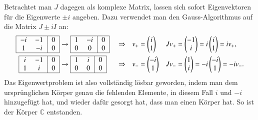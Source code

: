 Betrachtet man $J$ dagegen als komplexe Matrix, lassen sich sofort
Eigenvektoren für die Eigenwerte $\pm i$ angeben.
Dazu verwendet man den Gauss-Algorithmus auf die Matrix $J\pm iI$ an:
\[
\begin{aligned}
\begin{tabular}{|>{$}c<{$}>{$}c<{$}|>{$}c<{$}|}
\hline
-i&-1&0\\
 1&-i&0\\
\hline
\end{tabular}
&\rightarrow
\begin{tabular}{|>{$}c<{$}>{$}c<{$}|>{$}c<{$}|}
\hline
 1&-i&0\\
 0& 0&0\\
\hline
\end{tabular}
&&\Rightarrow
&
v_+&=\begin{pmatrix}i\\1\end{pmatrix}
&
Jv_+&=\begin{pmatrix}-1\\i\end{pmatrix}
=
i\begin{pmatrix}i\\1\end{pmatrix}
=
iv_+,
\\
\begin{tabular}{|>{$}c<{$}>{$}c<{$}|>{$}c<{$}|}
\hline
 i&-1&0\\
 1& i&0\\
\hline
\end{tabular}
&\rightarrow
\begin{tabular}{|>{$}c<{$}>{$}c<{$}|>{$}c<{$}|}
\hline
 1& i&0\\
 0& 0&0\\
\hline
\end{tabular}
&&\Rightarrow
&
v_-&=\begin{pmatrix}-i\\1\end{pmatrix}
&
Jv_-&=\begin{pmatrix}1\\i\end{pmatrix}
=
-i\begin{pmatrix}-i\\1\end{pmatrix}
=
-iv_-.
\end{aligned}
\]
Das Eigenwertproblem ist also vollständig lösbar geworden, indem
man dem ursprünglichen Körper genau die fehlenden Elemente, in diesem
Fall $i$ und $-i$ hinzugefügt hat, und wieder dafür gesorgt hat, dass
man einen Körper hat.
So ist der Körper $\mathbb C$ entstanden.

